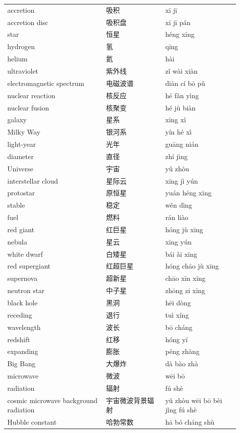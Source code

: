 \documentclass[11pt]{article}
\begin{document}
\begin{longtable}{@{}p{0.40\linewidth}p{0.24\linewidth}p{0.30\linewidth}@{}}
accretion & 吸积 & xī jī \\
accretion disc & 吸积盘 & xī jī pán \\
star & 恒星 & héng xīng \\
hydrogen & 氢 & qīng \\
helium & 氦 & hài \\
ultraviolet & 紫外线 & zǐ wài xiàn \\
electromagnetic spectrum & 电磁波谱 & diàn cí bō pǔ \\
nuclear reaction & 核反应 & hé fǎn yìng \\
nuclear fusion & 核聚变 & hé jù biàn \\
galaxy & 星系 & xīng xì \\
Milky Way & 银河系 & yín hé xì \\
light-year & 光年 & guāng nián \\
diameter & 直径 & zhí jìng \\
Universe & 宇宙 & yǔ zhòu \\
interstellar cloud & 星际云 & xīng jì yún \\
protostar & 原恒星 & yuán héng xīng \\
stable & 稳定 & wěn dìng \\
fuel & 燃料 & rán liào \\
red giant & 红巨星 & hóng jù xīng \\
nebula & 星云 & xīng yún \\
white dwarf & 白矮星 & bái ǎi xīng \\
red supergiant & 红超巨星 & hóng chāo jù xīng \\
supernova & 超新星 & chāo xīn xīng \\
neutron star & 中子星 & zhōng zi xīng \\
black hole & 黑洞 & hēi dòng \\
receding & 退行 & tuì xíng \\
wavelength & 波长 & bō cháng \\
redshift & 红移 & hóng yí \\
expanding & 膨胀 & péng zhàng \\
Big Bang & 大爆炸 & dà bào zhà \\
microwave & 微波 & wēi bō \\
radiation & 辐射 & fú shè \\
cosmic microwave background radiation & 宇宙微波背景辐射 & yǔ zhòu wēi bō bèi jǐng fú shè \\
Hubble constant & 哈勃常数 & hā bó cháng shù \\
\end{longtable}
\end{document}

